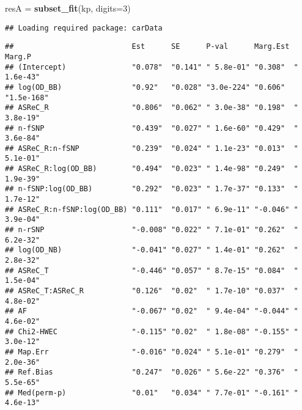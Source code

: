 \documentclass[]{article}
\newenvironment{Shaded}{\begin{snugshade}}{\end{snugshade}}
\newcommand{\KeywordTok}[1]{\textcolor[rgb]{0.13,0.29,0.53}{\textbf{#1}}}
\newcommand{\DataTypeTok}[1]{\textcolor[rgb]{0.13,0.29,0.53}{#1}}
\newcommand{\DecValTok}[1]{\textcolor[rgb]{0.00,0.00,0.81}{#1}}
\newcommand{\StringTok}[1]{\textcolor[rgb]{0.31,0.60,0.02}{#1}}
\newcommand{\OperatorTok}[1]{\textcolor[rgb]{0.81,0.36,0.00}{\textbf{#1}}}
\newcommand{\NormalTok}[1]{#1}
\begin{document}
\begin{Shaded}
\begin{Highlighting}[]
\NormalTok{resA =}\StringTok{ }\KeywordTok{subset_fit}\NormalTok{(kp, }\DataTypeTok{digits=}\DecValTok{3}\NormalTok{)}
\end{Highlighting}
\end{Shaded}

\begin{verbatim}
## Loading required package: carData
\end{verbatim}

\begin{Shaded}
\end{Shaded}

\begin{verbatim}
##                           Est      SE      P-val      Marg.Est Marg.P    
## (Intercept)               "0.078"  "0.141" " 5.8e-01" "0.308"  " 1.6e-43"
## log(OD_BB)                "0.92"   "0.028" "3.0e-224" "0.606"  "1.5e-168"
## ASReC_R                   "0.806"  "0.062" " 3.0e-38" "0.198"  " 3.8e-19"
## n-fSNP                    "0.439"  "0.027" " 1.6e-60" "0.429"  " 3.6e-84"
## ASReC_R:n-fSNP            "0.239"  "0.024" " 1.1e-23" "0.013"  " 5.1e-01"
## ASReC_R:log(OD_BB)        "0.494"  "0.023" " 1.4e-98" "0.249"  " 1.9e-39"
## n-fSNP:log(OD_BB)         "0.292"  "0.023" " 1.7e-37" "0.133"  " 1.7e-12"
## ASReC_R:n-fSNP:log(OD_BB) "0.111"  "0.017" " 6.9e-11" "-0.046" " 3.9e-04"
## n-rSNP                    "-0.008" "0.022" " 7.1e-01" "0.262"  " 6.2e-32"
## log(OD_NB)                "-0.041" "0.027" " 1.4e-01" "0.262"  " 2.8e-32"
## ASReC_T                   "-0.446" "0.057" " 8.7e-15" "0.084"  " 1.5e-04"
## ASReC_T:ASReC_R           "0.126"  "0.02"  " 1.7e-10" "0.037"  " 4.8e-02"
## AF                        "-0.067" "0.02"  " 9.4e-04" "-0.044" " 4.6e-02"
## Chi2-HWEC                 "-0.115" "0.02"  " 1.8e-08" "-0.155" " 3.0e-12"
## Map.Err                   "-0.016" "0.024" " 5.1e-01" "0.279"  " 2.0e-36"
## Ref.Bias                  "0.247"  "0.026" " 5.6e-22" "0.376"  " 5.5e-65"
## Med(perm-p)               "0.01"   "0.034" " 7.7e-01" "-0.161" " 4.6e-13"
\end{verbatim}

\begin{Shaded}
\end{Shaded}
\end{document}

